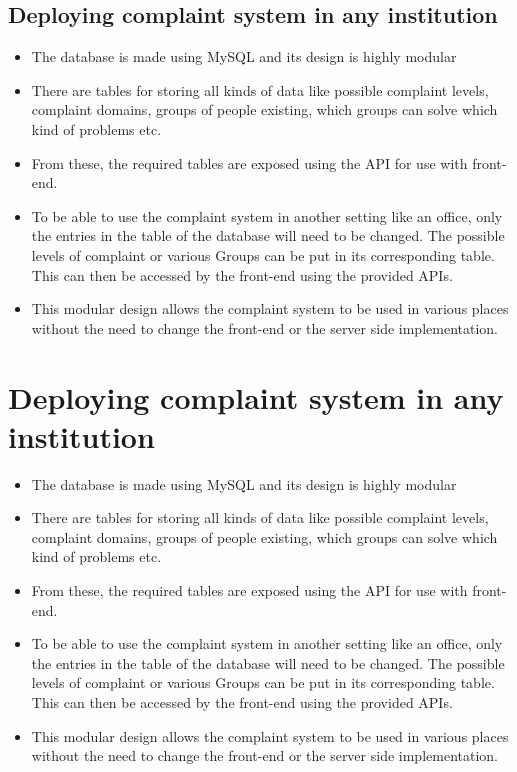 \documentclass[12pt]{article}
\begin{document}
\subsection{Deploying complaint system in any institution}
\begin{itemize}
\item The database is made using MySQL and its design is highly modular
\item There are tables for storing all kinds of data like possible complaint levels, complaint domains, groups of people existing, which groups can solve which kind of problems etc.
\item From these, the required tables are exposed using the API for use with front-end.
\item To be able to use the complaint system in another setting like an office, only the entries in the table of the database will need to be changed. The possible levels of complaint or various Groups can be put in its corresponding table. This can then be accessed by the front-end using the provided APIs.
\item This modular design allows the complaint system to be used in various places without the need to change the front-end or the server side implementation.
\end{itemize}




\section{Deploying complaint system in any institution}
\begin{itemize}
\item The database is made using MySQL and its design is highly modular
\item There are tables for storing all kinds of data like possible complaint levels, complaint domains, groups of people existing, which groups can solve which kind of problems etc.
\item From these, the required tables are exposed using the API for use with front-end.
\item To be able to use the complaint system in another setting like an office, only the entries in the table of the database will need to be changed. The possible levels of complaint or various Groups can be put in its corresponding table. This can then be accessed by the front-end using the provided APIs.
\item This modular design allows the complaint system to be used in various places without the need to change the front-end or the server side implementation.
\end{itemize}
\end{document}
